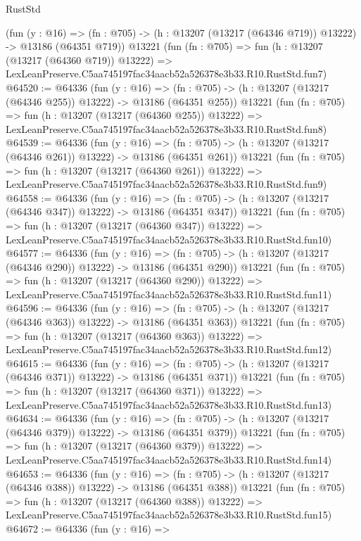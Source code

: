 \begin{lexlean}{RustStd}
\begin{coremodule}
    (fun (y : @16) =>
    (fn : @705) -> (h : @13207 (@13217 (@64346 @719)) @13222) -> @13186 (@64351 @719))
    @13221
    (fun (fn : @705) =>
    fun (h : @13207 (@13217 (@64360 @719)) @13222) =>
    LexLeanPreserve.C5aa745197fac34aacb52a526378e3b33.R10.RustStd.fun7)
@64520 := @64336
    (fun (y : @16) =>
    (fn : @705) -> (h : @13207 (@13217 (@64346 @255)) @13222) -> @13186 (@64351 @255))
    @13221
    (fun (fn : @705) =>
    fun (h : @13207 (@13217 (@64360 @255)) @13222) =>
    LexLeanPreserve.C5aa745197fac34aacb52a526378e3b33.R10.RustStd.fun8)
@64539 := @64336
    (fun (y : @16) =>
    (fn : @705) -> (h : @13207 (@13217 (@64346 @261)) @13222) -> @13186 (@64351 @261))
    @13221
    (fun (fn : @705) =>
    fun (h : @13207 (@13217 (@64360 @261)) @13222) =>
    LexLeanPreserve.C5aa745197fac34aacb52a526378e3b33.R10.RustStd.fun9)
@64558 := @64336
    (fun (y : @16) =>
    (fn : @705) -> (h : @13207 (@13217 (@64346 @347)) @13222) -> @13186 (@64351 @347))
    @13221
    (fun (fn : @705) =>
    fun (h : @13207 (@13217 (@64360 @347)) @13222) =>
    LexLeanPreserve.C5aa745197fac34aacb52a526378e3b33.R10.RustStd.fun10)
@64577 := @64336
    (fun (y : @16) =>
    (fn : @705) -> (h : @13207 (@13217 (@64346 @290)) @13222) -> @13186 (@64351 @290))
    @13221
    (fun (fn : @705) =>
    fun (h : @13207 (@13217 (@64360 @290)) @13222) =>
    LexLeanPreserve.C5aa745197fac34aacb52a526378e3b33.R10.RustStd.fun11)
@64596 := @64336
    (fun (y : @16) =>
    (fn : @705) -> (h : @13207 (@13217 (@64346 @363)) @13222) -> @13186 (@64351 @363))
    @13221
    (fun (fn : @705) =>
    fun (h : @13207 (@13217 (@64360 @363)) @13222) =>
    LexLeanPreserve.C5aa745197fac34aacb52a526378e3b33.R10.RustStd.fun12)
@64615 := @64336
    (fun (y : @16) =>
    (fn : @705) -> (h : @13207 (@13217 (@64346 @371)) @13222) -> @13186 (@64351 @371))
    @13221
    (fun (fn : @705) =>
    fun (h : @13207 (@13217 (@64360 @371)) @13222) =>
    LexLeanPreserve.C5aa745197fac34aacb52a526378e3b33.R10.RustStd.fun13)
@64634 := @64336
    (fun (y : @16) =>
    (fn : @705) -> (h : @13207 (@13217 (@64346 @379)) @13222) -> @13186 (@64351 @379))
    @13221
    (fun (fn : @705) =>
    fun (h : @13207 (@13217 (@64360 @379)) @13222) =>
    LexLeanPreserve.C5aa745197fac34aacb52a526378e3b33.R10.RustStd.fun14)
@64653 := @64336
    (fun (y : @16) =>
    (fn : @705) -> (h : @13207 (@13217 (@64346 @388)) @13222) -> @13186 (@64351 @388))
    @13221
    (fun (fn : @705) =>
    fun (h : @13207 (@13217 (@64360 @388)) @13222) =>
    LexLeanPreserve.C5aa745197fac34aacb52a526378e3b33.R10.RustStd.fun15)
@64672 := @64336
    (fun (y : @16) =>

\end{coremodule}
\end{lexlean}
